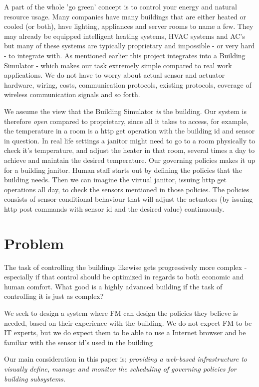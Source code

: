 A part of the whole 'go green' concept is to control your energy and natural resource usage. Many companies have many buildings that are either heated or cooled (or both), have lighting, appliances and server rooms to name a few. They may already be equipped intelligent heating systems, HVAC systems and AC's but many of these systems are typically proprietary and impossible - or very hard - to integrate with. As mentioned earlier this project integrates into a Building Simulator - which makes our task extremely simple compared to real work applications. We do not have to worry about actual sensor and actuator hardware, wiring, costs, communication protocols, existing protocols, coverage of wireless communication signals and so forth.

We assume the view that the Building Simulator \textit{is} the building. Our system is therefore \textit{open} compared to proprietary, since all it takes to access, for example, the temperature in a room is a http get operation with the building id and sensor in question. In real life settings a janitor might need to go to a room physically to check it's temperature, and adjust the heater in that room, several times a day to achieve and maintain the desired temperature. Our governing policies makes it up for a building janitor. Human staff starts out by defining the policies that the building needs. Then we can imagine the virtual janitor, issuing http get operations all day, to check the sensors mentioned in those policies. The policies consists of sensor-conditional behaviour that will adjust the actuators (by issuing http post commands with sensor id and the desired value) continuously.

\section{Problem}
The task of controlling the buildings likewise gets progressively more complex - especially if that control should be optimized in regards to both economic and human comfort. What good is a highly advanced building if the task of controlling it is just as complex?

We seek to design a system where FM can design the policies they believe is needed, based on their experience with the building. We do not expect FM to be IT experts, but we do expect them to be able to use a Internet browser and be familiar with the sensor id's used in the building

Our main consideration in this paper is; \textit{providing a web-based infrastructure to visually define, manage and monitor the scheduling of governing policies for building subsystems.}


